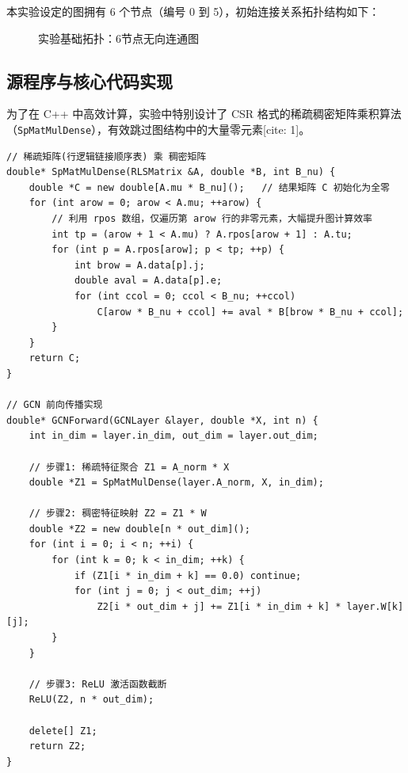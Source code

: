 \documentclass[12pt,a4paper]{article}
\begin{document}
本实验设定的图拥有 6 个节点（编号 0 到 5），初始连接关系拓扑结构如下：
\begin{figure}[H]
    \centering
    \caption{实验基础拓扑：6节点无向连通图}
\end{figure}

\subsection{源程序与核心代码实现}
为了在 C++ 中高效计算，实验中特别设计了 CSR 格式的稀疏稠密矩阵乘积算法（\texttt{SpMatMulDense}），有效跳过图结构中的大量零元素[cite: 1]。

\begin{lstlisting}[caption={稀疏矩阵乘法与GCN前向传播核心代码片段}]
// 稀疏矩阵(行逻辑链接顺序表) 乘 稠密矩阵
double* SpMatMulDense(RLSMatrix &A, double *B, int B_nu) {
    double *C = new double[A.mu * B_nu]();   // 结果矩阵 C 初始化为全零
    for (int arow = 0; arow < A.mu; ++arow) {
        // 利用 rpos 数组，仅遍历第 arow 行的非零元素，大幅提升图计算效率
        int tp = (arow + 1 < A.mu) ? A.rpos[arow + 1] : A.tu;                    
        for (int p = A.rpos[arow]; p < tp; ++p) {
            int brow = A.data[p].j;          
            double aval = A.data[p].e;       
            for (int ccol = 0; ccol < B_nu; ++ccol)
                C[arow * B_nu + ccol] += aval * B[brow * B_nu + ccol];
        }
    }
    return C;
}

// GCN 前向传播实现
double* GCNForward(GCNLayer &layer, double *X, int n) {
    int in_dim = layer.in_dim, out_dim = layer.out_dim;
    
    // 步骤1: 稀疏特征聚合 Z1 = A_norm * X
    double *Z1 = SpMatMulDense(layer.A_norm, X, in_dim);
    
    // 步骤2: 稠密特征映射 Z2 = Z1 * W
    double *Z2 = new double[n * out_dim]();
    for (int i = 0; i < n; ++i) {                
        for (int k = 0; k < in_dim; ++k) {       
            if (Z1[i * in_dim + k] == 0.0) continue;          
            for (int j = 0; j < out_dim; ++j)    
                Z2[i * out_dim + j] += Z1[i * in_dim + k] * layer.W[k][j];
        }
    }
    
    // 步骤3: ReLU 激活函数截断
    ReLU(Z2, n * out_dim);
    
    delete[] Z1;       
    return Z2;         
}
\end{lstlisting}
\end{document}

